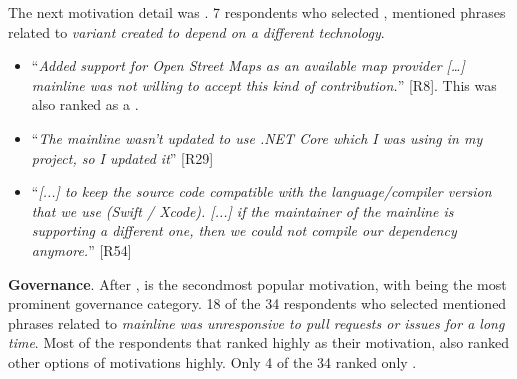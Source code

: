 \nd The next  motivation detail was .
7 respondents who selected , mentioned phrases related to \emph{variant created to depend on a different technology}.

\begin{itemize}[leftmargin=*]
\item ``\emph{Added support for Open Street Maps as an available map provider [\ldots] mainline was not willing to accept this kind of contribution.}'' [R8]. This was also ranked as a .
\item ``\emph{The mainline wasn't updated to use .NET Core which I was using in my project, so I updated it}'' [R29]
\item ``\emph{[...] to keep the source code compatible with the language/compiler version that we use (Swift / Xcode). [...] %
if the maintainer of the mainline is supporting a different one, then we could not compile our dependency anymore.}'' [R54]
\end{itemize}

\nd \textbf{Governance}. After ,  is the secondmost popular motivation, with  being the most prominent governance category. 18 of the 34 respondents who selected  mentioned phrases related to \emph{mainline was unresponsive to pull requests or issues for a long time}. Most of the respondents that ranked  highly as their motivation, also ranked other options of motivations highly. Only 4 of the 34 ranked only .


